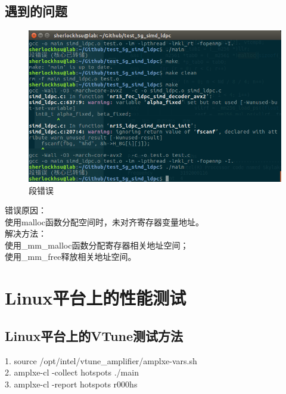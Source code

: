 \documentclass{article}
\begin{document}
\subsection{遇到的问题}
\begin{figure}[H]
	\centering
	\includegraphics[width = .8\textwidth]{err.png}
	\caption{段错误}
\end{figure}
错误原因：\\
使用malloc函数分配空间时，未对齐寄存器变量地址。\\
解决方法：\\
使用\_mm\_malloc函数分配寄存器相关地址空间；\\
使用\_mm\_free释放相关地址空间。

\section{Linux平台上的性能测试}
\subsection{Linux平台上的VTune测试方法}
1. source /opt/intel/vtune\_amplifier/amplxe-vars.sh\\
2. amplxe-cl -collect hotspots ./main\\
3. amplxe-cl -report hotspots r000hs
\end{document}
